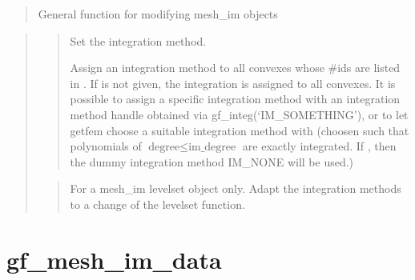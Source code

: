 \documentclass[a4paper,11pt,english]{sphinxmanual}
\begin{document}
\begin{quote}

General function for modifying mesh\_im objects
\end{quote}

\begin{quote}

\begin{quote}

Set the integration method.

Assign an integration method to all convexes whose \#ids are
listed in . If  is not given, the integration is
assigned to all convexes. It is possible to assign a specific
integration method with an integration method handle  obtained
via gf\_integ(‘IM\_SOMETHING’), or to let getfem choose a suitable
integration method with  (choosen such that polynomials
of \(\text{degree} \leq \text{im\_degree}\) are exactly integrated.
If , then the dummy integration method IM\_NONE will
be used.)
\end{quote}

\begin{quote}

For a mesh\_im levelset object only. Adapt the integration methods to a
change of the levelset function.
\end{quote}
\end{quote}


\section{gf\_mesh\_im\_data}
\label{\detokenize{matlab_octave/cmdref_gf_mesh_im_data:gf-mesh-im-data}}\label{\detokenize{matlab_octave/cmdref_gf_mesh_im_data::doc}}

\begin{sphinxVerbatim}[commandchars=\\\{\}]
       
\end{sphinxVerbatim}
\end{document}
